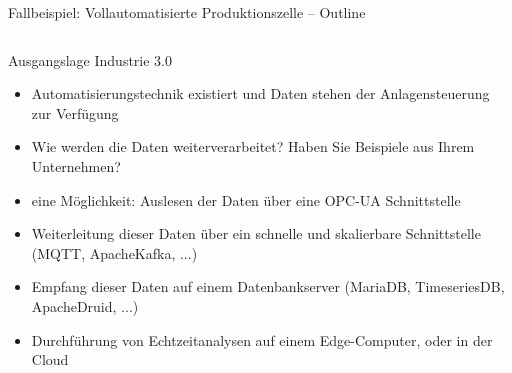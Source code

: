 \documentclass[aspectratio=1610, xcolor=dvipsnames, 9pt]{beamer}
\begin{document}
                \begin{frame}{Fallbeispiel: Vollautomatisierte Produktionszelle -- Outline}
                  \begin{columns}
                    \begin{column}{1\textwidth}
                      Ausgangslage Industrie 3.0
                      \begin{itemize}
                        \item Automatisierungstechnik existiert und Daten stehen der Anlagensteuerung zur Verfügung\newline
                        \item Wie werden die Daten weiterverarbeitet? Haben Sie Beispiele aus Ihrem Unternehmen? \newline
                        \item eine Möglichkeit: Auslesen der Daten über eine OPC-UA Schnittstelle \newline
                        \item Weiterleitung dieser Daten über ein schnelle und skalierbare Schnittstelle (MQTT, ApacheKafka, ...) \newline
                        \item Empfang dieser Daten auf einem Datenbankserver (MariaDB, TimeseriesDB, ApacheDruid, ...) \newline
                        \item Durchführung von Echtzeitanalysen auf einem Edge-Computer, oder in der Cloud
                      \end{itemize}
                    \end{column}
                  \end{columns}
                    \end{frame}
\end{document}
